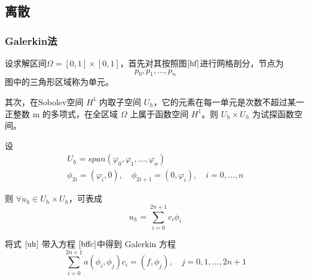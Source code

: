 \documentclass[a4paper,UTF8,titlepage]{ctexart}
\begin{document}
\subsection{离散}

\subsubsection{Galerkin法}

\begin{figure}[h]
	\centering
	\caption{}
	\label{hf}
\end{figure}

设求解区间$\Omega = [0,1] \times [0,1]$，首先对其按照图$\ref{hf}$进行网格剖分，节点为
$$
p_0, p_1, ... , p_n 
$$
图中的三角形区域称为单元。

其次，在Sobolev空间 $H^1$ 内取子空间 $U_h$，它的元素在每一单元是次数不超过某一正整数 m 的多项式，在全区域 $\Omega$ 上属于函数空间 $H^1$。则 $U_h \times U_h$ 为试探函数空间。

设
$$
\begin{matrix}
	U_h = span(\varphi_0, \varphi_1, ... , \varphi_n) \\
	\phi_{2i} = (\varphi_i, 0), \quad \phi_{2i+1} = (0, \varphi_i), \quad i=0,...,n
\end{matrix}
$$

则 $\forall u_h \in U_h \times U_h$，可表成
\begin{equation}
	u_h = \sum\limits_{i=0}^{2n+1} c_i \phi_i
	\label{uh}
\end{equation}

将式 $\eqref{uh}$ 带入方程 $\eqref{bffc}$中得到 Galerkin 方程
\begin{equation}
	\sum\limits_{i=0}^{2n+1} a(\phi_i, \phi_j) c_i = (f,\phi_j), \quad j = 0, 1, ... , 2n+1 
	\label{galerkin}
\end{equation} 
\end{document}
